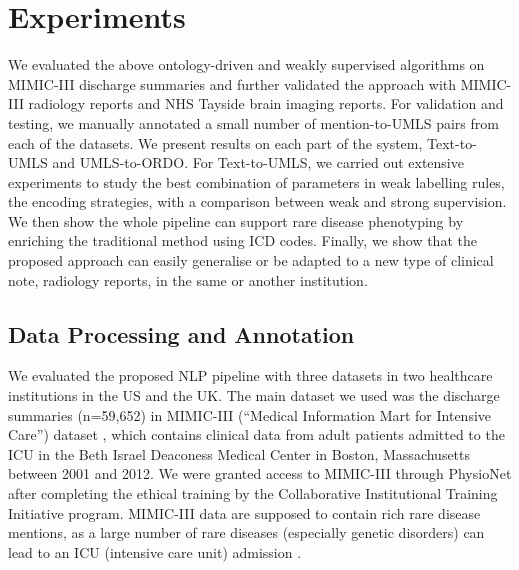 \documentclass[twocolumn]{bmcart}
\begin{document}
\section*{Experiments}
\label{sec:experiments}

We evaluated the above ontology-driven and weakly supervised algorithms on MIMIC-III discharge summaries and further validated the approach with MIMIC-III radiology reports and NHS Tayside brain imaging reports. For validation and testing, we manually annotated a small number of mention-to-UMLS pairs from each of the datasets. We present results on each part of the system, Text-to-UMLS and UMLS-to-ORDO. For Text-to-UMLS, we carried out extensive experiments to study the best combination of parameters in weak labelling rules, the encoding strategies, with a comparison between weak and strong supervision. We then show the whole pipeline can support rare disease phenotyping by enriching the traditional method using ICD codes. Finally, we show that the proposed approach can easily generalise or be adapted to a new type of clinical note, radiology reports, in the same or another institution.


\subsection*{Data Processing and Annotation}
We evaluated the proposed NLP pipeline with three datasets in two healthcare institutions in the US and the UK. The main dataset we used was the discharge summaries (n=59,652) in MIMIC-III (``Medical Information Mart for Intensive Care'') dataset \cite{johnson_mimic-iii_2016}, which contains clinical data from adult patients admitted to the ICU in the Beth Israel Deaconess Medical Center in Boston, Massachusetts between 2001 and 2012. We were granted access to MIMIC-III through PhysioNet after completing the ethical training by the Collaborative Institutional Training Initiative program. MIMIC-III data are supposed to contain rich rare disease mentions, as a large number of rare diseases (especially genetic disorders) can lead to an ICU (intensive care unit) admission \cite{textoris_genetic_2014}.
\end{document}
